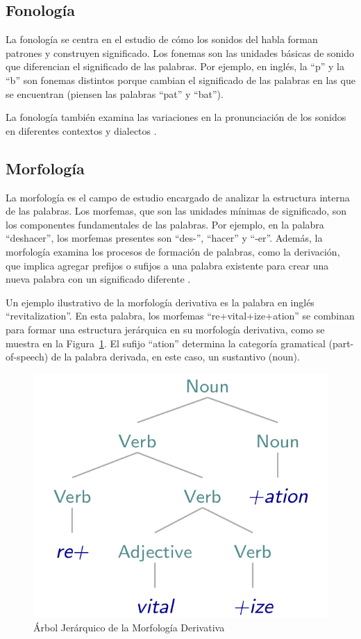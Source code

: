 \subsection{Fonología}

La fonología se centra en el estudio de cómo los sonidos del habla forman patrones y construyen significado. Los fonemas son las unidades básicas de sonido que diferencian el significado de las palabras. Por ejemplo, en inglés, la ``p'' y la ``b'' son fonemas distintos porque cambian el significado de las palabras en las que se encuentran (piensen las palabras ``pat'' y ``bat'').

La fonología también examina las variaciones en la pronunciación de los sonidos en diferentes contextos y dialectos \cite{fromkin2018introduction}.
\subsection{Morfología}

La morfología es el campo de estudio encargado de analizar la estructura interna de las palabras. Los morfemas, que son las unidades mínimas de significado, son los componentes fundamentales de las palabras. Por ejemplo, en la palabra ``deshacer'', los morfemas presentes son ``des-'', ``hacer'' y ``-er''. Además, la morfología examina los procesos de formación de palabras, como la derivación, que implica agregar prefijos o sufijos a una palabra existente para crear una nueva palabra con un significado diferente \cite{JohnsonMLSS}.

Un ejemplo ilustrativo de la morfología derivativa es la palabra en inglés ``revitalization''. En esta palabra, los morfemas ``re+vital+ize+ation'' se combinan para formar una estructura jerárquica en su morfología derivativa, como se muestra en la Figura~\ref{fig:morfo_der}. El sufijo ``ation'' determina la categoría gramatical (part-of-speech) de la palabra derivada, en este caso, un sustantivo (noun).

\begin{figure}[h]
	\centering
	\includegraphics[scale = 0.2]{pics/morphology.png}
	\caption{Árbol Jerárquico de la Morfología Derivativa}
	\label{fig:morfo_der}
\end{figure}

